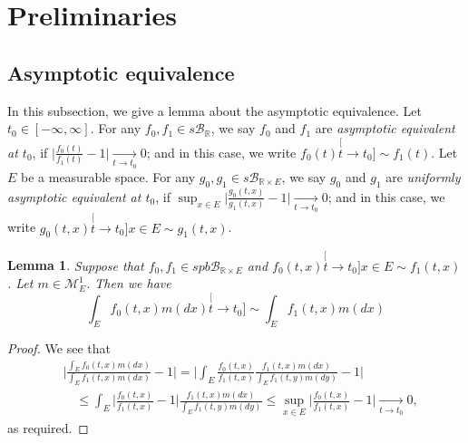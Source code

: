 \documentclass[12pt, a4paper]{amsart}
\newtheorem{lem}[thm]{Lemma}
\theoremstyle{definition}
\numberwithin{equation}{section}
\begin{document}
\section{Preliminaries}
\label{sec: Preliminaries}

\subsection{Asymptotic equivalence}
\label{sec: Asymptotic equivalence}
	In this subsection, we give a lemma about the asymptotic equivalence.	
	Let $t_0 \in [-\infty,\infty]$.
	For any $f_0, f_1\in s\mathscr B_{\mathbb R}$, we say $f_0$ and $f_1$ are \emph{asymptotic equivalent at $t_0$}, if $\big|\frac{f_0(t)}{f_1(t)} - 1\big| \xrightarrow[t\to t_0]{} 0$;
	and in this case, we write $f_0(t) \stackrel[t\to t_0]{}{\sim} f_1(t)$.
	Let $E$ be a measurable space.
	For any $g_0, g_1\in s\mathscr B_{\mathbb R\times E}$, we say $g_0$ and $g_1$ are \emph{uniformly asymptotic equivalent at $t_0$}, if $\sup_{x\in E}\big|\frac{g_0(t,x)}{g_1(t,x)} - 1\big| \xrightarrow[t\to t_0]{} 0$; and in this case, we write $g_0(t,x)\stackrel[t\to t_0]{x\in E}{\sim}g_1(t,x)$.

\begin{lem}
\label{lem: asymptotic equivalent of integration}
	Suppose that $f_0,f_1\in spb\mathscr B_{\mathbb R \times E}$ and $f_0(t,x)\stackrel[t\to t_0]{x\in E}{\sim}f_1(t,x)$.
	Let $m \in \mathcal M^1_E$. Then we have
\[
	\int_E f_0(t,x)m(dx)
	\stackrel[t\to t_0]{}{\sim}
	\int_E f_1(t,x)m(dx)
\]
\end{lem}
\begin{proof}
	We see that
\[\begin{split}
	&\Big| \frac{	\int_E f_0(t,x)m(dx) }{ 	\int_E f_1(t,x)m(dx)  } - 1 \Big|
	= \Big| \int_E \frac{f_0(t,x)}{f_1(t,x)} \frac{f_1(t,x)m(dx)}{	\int_E f_1(t,y)m(dy)  } - 1\Big|
	\\&\quad \leq \int_E \Big|  \frac{f_0(t,x)}{f_1(t,x)} - 1 \Big| \frac{f_1(t,x)m(dx)}{	\int_E f_1(t,y)m(dy)  }
	\leq \sup_{x\in E} \Big|  \frac{f_0(t,x)}{f_1(t,x)} - 1 \Big|
	\xrightarrow[t\to t_0]{} 0,
\end{split}\]
	as required.
\end{proof}
\end{document}
